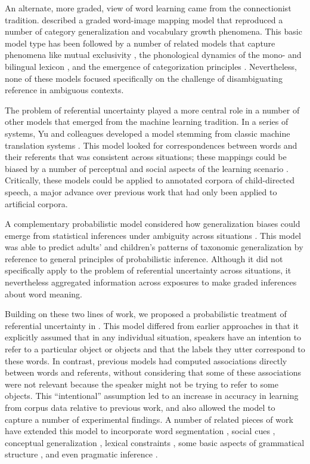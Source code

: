 \documentclass[man,noapacite,12pt]{apa2}
\begin{document}
An alternate, more graded, view of word learning came from the connectionist tradition.  described a graded word-image mapping model that reproduced a number of category generalization and vocabulary growth phenomena. This basic model type has been followed by a number of related models that capture phenomena like mutual exclusivity \cite{regier2005}, the phonological dynamics of the mono- and bilingual lexicon \cite{li2002,li2004,li2007}, and the emergence of categorization principles \cite{mayor2010}. Nevertheless, none of these models focused specifically on the challenge of disambiguating reference in ambiguous contexts. 

The problem of referential uncertainty played a more central role in a number of other models that emerged from the machine learning tradition. In a series of systems, Yu and colleagues developed a model stemming from classic machine translation systems \cite{brown1993}. This model looked for correspondences between words and their referents that was consistent across situations; these mappings could be biased by a number of perceptual and social aspects of the learning scenario \cite{yu2005,yu2007}. Critically, these models could be applied to annotated corpora of child-directed speech, a major advance over previous work that had only been applied to artificial corpora. 

A complementary probabilistic model considered how generalization biases could emerge from statistical inferences under ambiguity across situations \cite{xu2007}. This model was able to predict adults' and children's patterns of taxonomic generalization by reference to general principles of probabilistic inference. Although it did not specifically apply to the problem of referential uncertainty across situations, it nevertheless aggregated information across exposures to make graded inferences about word meaning. 

Building on these two lines of work, we proposed a probabilistic treatment of referential uncertainty in . This model differed from earlier approaches in that it explicitly assumed that in any individual situation, speakers have an intention to refer to a particular object or objects and that the labels they utter correspond to these words. In contrast, previous models had computed associations directly between words and referents, without considering that some of these associations were not relevant because the speaker might not be trying to refer to some objects. This ``intentional'' assumption led to an increase in accuracy in learning from corpus data relative to previous work, and also allowed the model to capture a number of experimental findings. A number of related pieces of work have extended this model to incorporate word segmentation \cite{johnson2010}, social cues \cite{frank2008,johnson2012}, conceptual generalization \cite{lewis2013b}, lexical constraints \cite{lewis2013}, some basic aspects of grammatical structure \cite{johnson2010}, and even pragmatic inference \cite{smith2013}.
\end{document}
